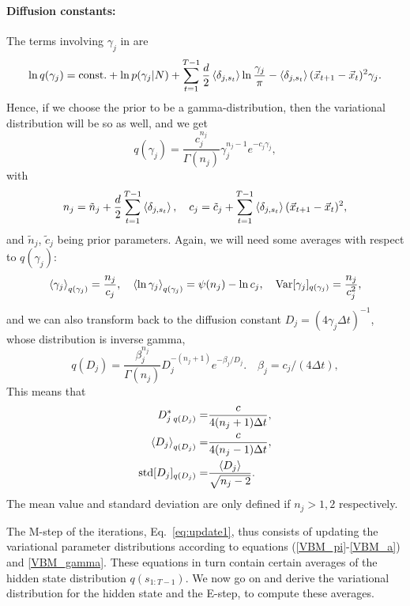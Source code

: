 \paragraph{Diffusion constants:}
The terms involving $\gamma_j$ in  are
\begin{equation}
  \ln q(\gamma_j)=\text{const.}
  +\ln p(\gamma_j|N)+\sum_{t=1}^{T-1}
  \frac d2\left\langle \delta_{j,s_t}\right\rangle\ln\frac{\gamma_j}{\pi}
  -\left\langle \delta_{j,s_t}\right\rangle(\vec{x}_{t+1}-\vec{x}_t)^2\gamma_j.
\end{equation}
Hence, if we choose the prior to be a gamma-distribution, then the
variational distribution will be so as well, and we get
\begin{equation}
  q(\gamma_j)=\frac{c_j^{n_j}}{\Gamma(n_j)}\gamma_j^{n_j-1}e^{-c_j\gamma_j},
\end{equation}
with
\begin{equation}\label{VBM_gamma}
  n_j=\tilde n_j+\frac d2\sum_{t=1}^{T-1}\left\langle \delta_{j,s_t}\right\rangle,\quad
  c_j=\tilde c_j+\sum_{t=1}^{T-1}\left\langle \delta_{j,s_t}\right\rangle(\vec{x}_{t+1}-\vec{x}_t)^2,
\end{equation}
and $\tilde n_j$, $\tilde c_j$ being prior parameters. Again, we will
need some averages with respect to $q(\gamma_j)$:
\begin{equation}\label{gammaprop}
  \left\langle \gamma_j\right\rangle_{q(\gamma_j)}=\frac{n_j}{c_j},\quad
  \left\langle \ln\gamma_j\right\rangle_{q(\gamma_j)}=\psi(n_j)-\ln c_j,\quad  
  \text{Var}[\gamma_j]_{q(\gamma_j)}=\frac{n_j}{c_j^2},
\end{equation}
and we can also transform back to the diffusion constant
$D_j=(4\gamma_j\Delta t)^{-1}$, whose distribution is inverse gamma,
\begin{equation}\label{eq:qD}
  q(D_j)=\frac{\beta_j^{n_j}}{\Gamma(n_j)}D_j^{-(n_j+1)}e^{-\beta_j/D_j}.
  \quad \beta_j=c_j/(4\Delta t),
\end{equation}
This means that
\begin{align}
  D^*_{j\;q(D_j)}=&\frac{c}{4(n_j+1)\Delta t},\\
  \left\langle D_j\right\rangle_{q(D_j)}=&\frac{c}{4(n_j-1)\Delta t},\\
  \text{std}[D_j]_{q(D_j)} =&\frac{\left\langle D_j\right\rangle}{\sqrt{n_j-2}}.
\end{align}
The mean value and standard deviation are only defined if $n_j>1,2$
respectively.

The M-step of the iterations, Eq.~\eqref{eq:update1}, thus consists of
updating the variational parameter distributions according to
equations (\ref{VBM_pi}-\ref{VBM_a}) and \eqref{VBM_gamma}. These
equations in turn contain certain averages of the hidden state
distribution $q(s_{1:T-1})$. We now go on and derive the variational
distribution for the hidden state and the E-step, to compute these
averages.
